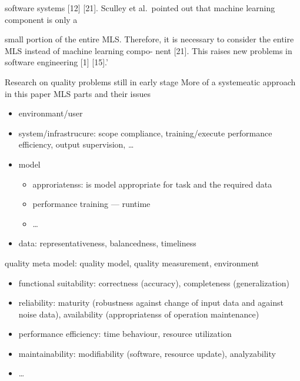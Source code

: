 software systems [12] [21]. Sculley et al.\ pointed out that machine learning component is only a

small portion of the entire \ac{MLS}. Therefore, it is necessary to consider the entire MLS instead
of machine learning compo- nent [21]. This raises new problems in software engineering [1] [15].'

Research on quality problems still in early stage
More of a systemeatic approach in this paper
MLS parts and their issues
\begin{itemize}
    \item environmant/user
    \item system/infrastrucure: scope compliance, training/execute performance efficiency, output
        supervision, \ldots
    \item model
        \begin{itemize}
            \item approriatenss: is model appropriate for task and the required data
            \item performance training --- runtime
            \item \ldots
        \end{itemize}
    \item data: representativeness, balancedness, timeliness
\end{itemize}
quality meta model: quality model, quality measurement, environment
\begin{itemize}
    \item functional suitability: correctness (accuracy), completeness (generalization)
    \item reliability: maturity (robustness against change of input data and against noise data),
        availability (appropriatenss of operation maintenance)
    \item performance efficiency: time behaviour, resource utilization
    \item maintainability: modifiability (software, resource update), analyzability
    \item \ldots
\end{itemize}
